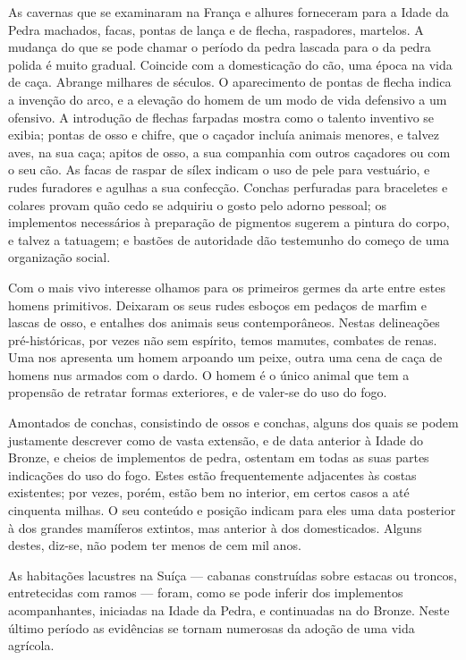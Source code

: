 \documentclass[11pt,a5paper,twoside,openany]{book}
\begin{document}
As cavernas que se examinaram na França e alhures forneceram para a Idade da Pedra machados, facas, pontas de lança e de flecha, raspadores, martelos. A mudança do que se pode chamar o período da pedra lascada para o da pedra polida é muito gradual. Coincide com a domesticação do cão, uma época na vida de caça. Abrange milhares de séculos. O aparecimento de pontas de flecha indica a invenção do arco, e a elevação do homem de um modo de vida defensivo a um ofensivo. A introdução de flechas farpadas mostra como o talento inventivo se exibia; pontas de osso e chifre, que o caçador incluía animais menores, e talvez aves, na sua caça; apitos de osso, a sua companhia com outros caçadores ou com o seu cão. As facas de raspar de sílex indicam o uso de pele para vestuário, e rudes furadores e agulhas a sua confecção. Conchas perfuradas para braceletes e colares provam quão cedo se adquiriu o gosto pelo adorno pessoal; os implementos necessários à preparação de pigmentos sugerem a pintura do corpo, e talvez a tatuagem; e bastões de autoridade dão testemunho do começo de uma organização social.

Com o mais vivo interesse olhamos para os primeiros germes da arte entre estes homens primitivos. Deixaram os seus rudes esboços em pedaços de marfim e lascas de osso, e entalhes dos animais seus contemporâneos. Nestas delineações pré-históricas, por vezes não sem espírito, temos mamutes, combates de renas. Uma nos apresenta um homem arpoando um peixe, outra uma cena de caça de homens nus armados com o dardo. O homem é o único animal que tem a propensão de retratar formas exteriores, e de valer-se do uso do fogo.

Amontados de conchas, consistindo de ossos e conchas, alguns dos quais se podem justamente descrever como de vasta extensão, e de data anterior à Idade do Bronze, e cheios de implementos de pedra, ostentam em todas as suas partes indicações do uso do fogo. Estes estão frequentemente adjacentes às costas existentes; por vezes, porém, estão bem no interior, em certos casos a até cinquenta milhas. O seu conteúdo e posição indicam para eles uma data posterior à dos grandes mamíferos extintos, mas anterior à dos domesticados. Alguns destes, diz-se, não podem ter menos de cem mil anos.

As habitações lacustres na Suíça — cabanas construídas sobre estacas ou troncos, entretecidas com ramos — foram, como se pode inferir dos implementos acompanhantes, iniciadas na Idade da Pedra, e continuadas na do Bronze. Neste último período as evidências se tornam numerosas da adoção de uma vida agrícola.
\end{document}
